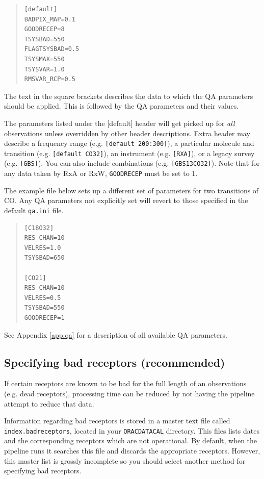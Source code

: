 \documentclass[twoside,11pt]{article}
\renewcommand{\_}{\texttt{\symbol{95}}}
\newcommand{\param}[1]{\texttt{#1}}
\begin{document}
\vspace{0.2cm}
\begin{quote}
\begin{verbatim}
[default]
BADPIX_MAP=0.1
GOODRECEP=8
TSYSBAD=550
FLAGTSYSBAD=0.5
TSYSMAX=550
TSYSVAR=1.0
RMSVAR_RCP=0.5
 \end{verbatim}
\end{quote}
The text in the square brackets describes the data to which the QA parameters should be applied. This is followed by the QA parameters and their values.

The parameters listed under the [default] header will get picked up for \textit{all} observations unless overridden by other header descriptions. Extra header may describe a frequency range (e.g. \texttt{[default 200:300]}), a particular molecule and transition (e.g. \texttt{[default CO32]}), an instrument  (e.g. \texttt{[RXA]}), or a legacy survey (e.g. \texttt{[GBS]}). You can also include combinations (e.g. \texttt{[GBS\_13CO32]}). Note that for any data taken by RxA or RxW, \param{GOODRECEP} must be set to 1.

The example file below sets up a different set of parameters for two transitions of CO. Any QA parameters not explicitly set will revert to those specified in the default \texttt{qa.ini} file.

\begin{center}
\vspace{0.2cm}
\begin{quote}
\begin{verbatim}
[C18O32]
RES_CHAN=10
VELRES=1.0
TSYSBAD=650

[CO21]
RES_CHAN=10
VELRES=0.5
TSYSBAD=550
GOODRECEP=1
\end{verbatim}
\end{quote}
\end{center}

See Appendix \ref{app:qa} for a description of all available QA parameters.


\subsection{Specifying bad receptors (recommended)}
\label{sec:badrec}
If certain receptors are known to be bad for the full length of an observations (e.g. dead receptors), processing time can be reduced by not having the pipeline attempt to reduce that data. 

Information regarding bad receptors is stored in a master text file called \param{index.bad\_receptors}, located in your \param{ORAC\_DATA\_CAL} directory. This files lists dates and the corresponding receptors which are not operational. By default, when the pipeline runs it searches this file and discards the appropriate receptors. However, this master list is grossly  incomplete so you should select another method for specifying bad receptors. 
\end{document}
